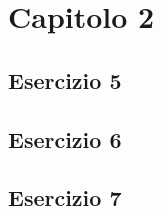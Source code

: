 \section{\textbf{Capitolo 2}}
\subsection{Esercizio 5}

\newpage
\subsection{Esercizio 6}

\newpage
\subsection{Esercizio 7}

\newpage
